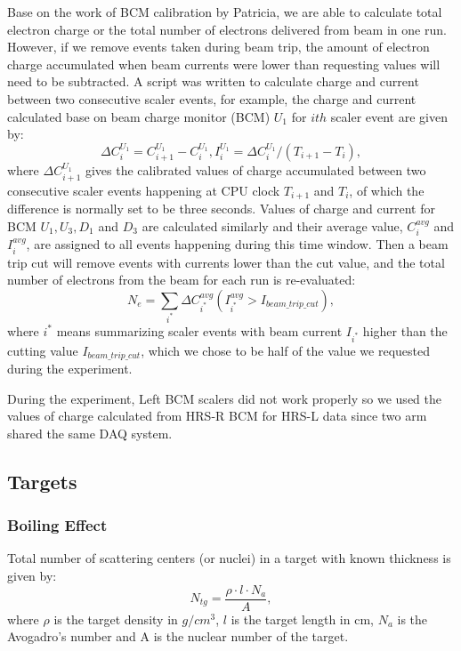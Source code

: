\documentclass[a4paper,18.pt]{article}
\begin{document}
Base on the work of BCM calibration by Patricia, we are able to calculate total electron charge or the total number of electrons delivered from beam in one run. However, if we remove events taken during beam trip, the amount of electron charge accumulated when beam currents were lower than requesting values will need to be subtracted. A script was written to calculate charge and current between two consecutive scaler events, for example, the charge and current calculated base on beam charge monitor (BCM) $U_{1}$ for $ith$ scaler event are given by:
\begin{equation}
  \Delta C_{i}^{U_{1}} = C_{i+1}^{U_{1}} - C_{i}^{U_{1}},  I_{i}^{U_{1}} = \Delta C_{i}^{U_{1}}/(T_{i+1}-T_{i}),
\end{equation}
where $\Delta C_{i+1}^{U_{1}}$ gives the calibrated values of charge accumulated between two consecutive scaler events happening at CPU clock $T_{i+1}$ and $T_{i}$, of which the difference is normally set to be three seconds. Values of charge and current for BCM $U_{1}, U_{3}, D_{1}$ and $D_{3}$ are calculated similarly and their average value, $C_{i}^{avg}$ and $I_{i}^{avg}$, are assigned to all events happening during this time window. Then a beam trip cut will remove events with currents lower than the cut value, and the total number of electrons from the beam for each run is re-evaluated:
\begin{equation}
  N_{e} = \sum_{i^{*}} \Delta C_{i^{*}}^{avg}(I_{i^{*}}^{avg}>I_{beam\_trip\_cut}),
\end{equation}
where $i^{*}$ means summarizing scaler events with beam current $I_{i^{*}}$ higher than the cutting value $I_{beam\_trip\_cut}$, which we chose to be half of the value we requested during the experiment.

During the experiment, Left BCM scalers did not work properly so we used the values of charge calculated from HRS-R BCM for HRS-L data since two arm shared the same DAQ system. 

\subsection{Targets}
\subsubsection{Boiling Effect}
Total number of scattering centers (or nuclei) in a target with known thickness is given by:
\begin{equation}
 N_{tg} = \frac{\rho\cdot l \cdot N_{a}}{A},
\end{equation}
where $\rho$ is the target density in $g/cm^{3}$, $l$ is the target length in cm, $N_{a}$ is the Avogadro's number and A is the nuclear number of the target. 
\end{document}
